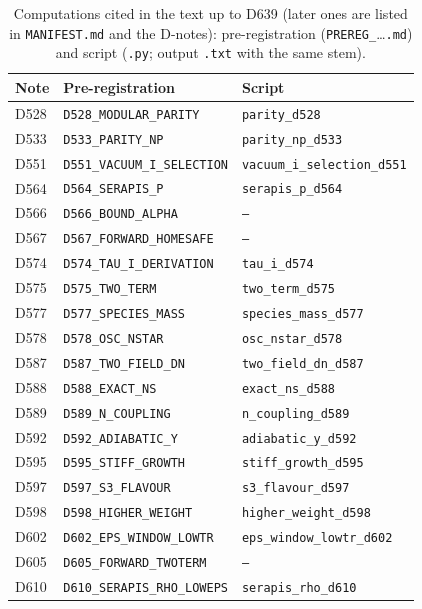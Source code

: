 \documentclass[aps,prd,twocolumn,superscriptaddress,nofootinbib,floatfix]{revtex4-2}
\begin{document}
\begin{table}[tbp]
\caption{Computations cited in the text up to D639 (later ones are listed in \texttt{MANIFEST.md} and the D-notes): pre-registration (\texttt{PREREG\_}\dots\texttt{.md}) and script (\texttt{.py}; output \texttt{.txt} with the same stem).}\label{tab:repro}
\begin{ruledtabular}
\footnotesize
\begin{tabular}{lll}
Note & Pre-registration & Script \\
\hline
D528 & \texttt{D528\_MODULAR\_PARITY} & \texttt{parity\_d528} \\
D533 & \texttt{D533\_PARITY\_NP} & \texttt{parity\_np\_d533} \\
D551 & \texttt{D551\_VACUUM\_I\_SELECTION} & \texttt{vacuum\_i\_selection\_d551} \\
D564 & \texttt{D564\_SERAPIS\_P} & \texttt{serapis\_p\_d564} \\
D566 & \texttt{D566\_BOUND\_ALPHA} & \texttt{---} \\
D567 & \texttt{D567\_FORWARD\_HOMESAFE} & \texttt{---} \\
D574 & \texttt{D574\_TAU\_I\_DERIVATION} & \texttt{tau\_i\_d574} \\
D575 & \texttt{D575\_TWO\_TERM} & \texttt{two\_term\_d575} \\
D577 & \texttt{D577\_SPECIES\_MASS} & \texttt{species\_mass\_d577} \\
D578 & \texttt{D578\_OSC\_NSTAR} & \texttt{osc\_nstar\_d578} \\
D587 & \texttt{D587\_TWO\_FIELD\_DN} & \texttt{two\_field\_dn\_d587} \\
D588 & \texttt{D588\_EXACT\_NS} & \texttt{exact\_ns\_d588} \\
D589 & \texttt{D589\_N\_COUPLING} & \texttt{n\_coupling\_d589} \\
D592 & \texttt{D592\_ADIABATIC\_Y} & \texttt{adiabatic\_y\_d592} \\
D595 & \texttt{D595\_STIFF\_GROWTH} & \texttt{stiff\_growth\_d595} \\
D597 & \texttt{D597\_S3\_FLAVOUR} & \texttt{s3\_flavour\_d597} \\
D598 & \texttt{D598\_HIGHER\_WEIGHT} & \texttt{higher\_weight\_d598} \\
D602 & \texttt{D602\_EPS\_WINDOW\_LOWTR} & \texttt{eps\_window\_lowtr\_d602} \\
D605 & \texttt{D605\_FORWARD\_TWOTERM} & \texttt{---} \\
D610 & \texttt{D610\_SERAPIS\_RHO\_LOWEPS} & \texttt{serapis\_rho\_d610} \\

\end{tabular}
\end{ruledtabular}
\end{table}
\end{document}
